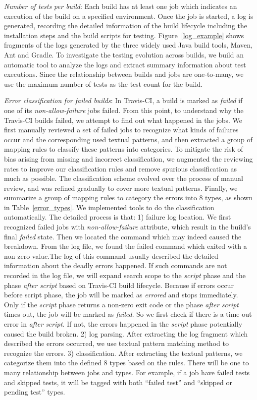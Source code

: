 
\emph{Number of tests per build}: 
Each build has at least one job which indicates an execution of the build on a specified environment. Once the job is started, a log is generated, recording the detailed information of the build lifecycle including the installation steps and the build scripts for testing. Figure~\ref{log_example} shows fragments of the logs generated by the three widely used Java build tools, Maven, Ant and Gradle. To investigate the testing evolution across builds, we build an automatic tool to analyze the logs and extract summary information about test executions.  Since the relationship between builds and jobs are one-to-many, we use the maximum number of tests as the test count for the build. 


\emph{Error classification for failed builds}: 
In Travis-CI, a build is marked as \textit{failed} if one of its \textit{non-allow-failure} jobs failed. From this point, to understand why the Travis-CI builds failed, we attempt to find out what happened in the jobs. We first manually reviewed a set of failed jobs to recognize what kinds of failures occur and the corresponding used textual patterns, and then extracted a group of mapping rules to classify these patterns into categories. To mitigate the risk of bias arising from missing and incorrect classification, we augmented the reviewing rates to improve our classification rules and remove spurious classification as much as possible. The classification scheme evolved over the process of manual review, and was refined gradually to cover more textual patterns. Finally, we summarize a group of mapping rules to category the errors into 8 types, as shown in Table~\ref{error_types}. 
We implemented tools to do the classification automatically. The detailed process is that: 1) failure log location. We first recognized failed jobs with \textit{non-allow-failure} attribute, which result in the build's final \textit{failed} state. Then we located the command which may indeed caused the breakdown. From the log file, we found the failed command which exited with a non-zero value.The log of this command usually described the detailed information about the deadly errors happened. If such commands are not recorded in the log file, we will expand search scope to the \textit{script} phase and the phase \textit{after script} based on Travis-CI build lifecycle. Because if errors occur before script phase, the job will be marked as \textit{errored} and stops immediately. Only if the \textit{script} phase returns a non-zero exit code or the phase \textit{after script} times out, the job will be marked as \textit{failed}. So we first check if there is a time-out error in \textit{after script}. If not, the errors happened in the \textit{script} phase potentially caused the build broken. 
2) log parsing. After extracting the log fragment which described the errors occurred, we use textual pattern matching method to recognize the errors. 
3) classification. After extracting the textual patterns, we categorize them  into the defined 8 types based on the rules. There will be one to many relationship between jobs and types. For example, if a job have failed tests and skipped tests, it will be tagged with both ``failed test'' and ``skipped or pending test'' types.


